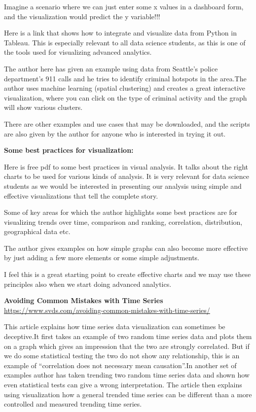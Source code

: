 \documentclass[]{book}
\theoremstyle{definition}
\theoremstyle{definition}
\theoremstyle{definition}
\theoremstyle{remark}
\begin{document}
Imagine a scenario where we can just enter some x values in a dashboard
form, and the visualization would predict the y variable!!!

Here is a link that shows how to integrate and visualize data from
Python in Tableau. This is especially relevant to all data science
students, as this is one of the tools used for visualizing advanced
analytics.

The author here has given an example using data from Seattle's police
department's 911 calls and he tries to identify criminal hotspots in the
area.The author uses machine learning (spatial clustering) and creates a
great interactive visualization, where you can click on the type of
criminal activity and the graph will show various clusters.

There are other examples and use cases that may be downloaded, and the
scripts are also given by the author for anyone who is interested in
trying it out.

\textbf{Some best practices for visualization:}\\
\citep{DataVizBestPrac}

Here is free pdf to some best practices in visual analysis. It talks
about the right charts to be used for various kinds of analysis. It is
very relevant for data science students as we would be interested in
presenting our analysis using simple and effective visualizations that
tell the complete story.

Some of key areas for which the author highlights some best practices
are for visualizing trends over time, comparison and ranking,
correlation, distribution, geographical data etc.

The author gives examples on how simple graphs can also become more
effective by just adding a few more elements or some simple adjustments.

I feel this is a great starting point to create effective charts and we
may use these principles also when we start doing advanced analytics.

\textbf{Avoiding Common Mistakes with Time Series}\\
\url{https://www.svds.com/avoiding-common-mistakes-with-time-series/}

This article explains how time series data visualization can sometimes
be deceptive.It first takes an example of two random time series data
and plots them on a graph which gives an impression that the two are
strongly correlated. But if we do some statistical testing the two do
not show any relationship, this is an example of ``correlation does not
necessary mean causation''.In another set of examples author has taken
trending two random time series data and shown how even statistical
tests can give a wrong interpretation. The article then explains using
visualization how a general trended time series can be different than a
more controlled and measured trending time series.
\end{document}
